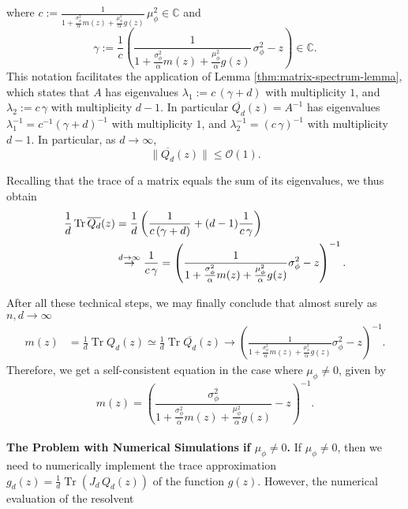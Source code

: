 \documentclass{article}
\begin{document}
where $c:=\frac{1}{1+\frac{\sigma_\phi^2}{\alpha}m(z) + \frac{\mu_\phi^2}{\alpha}g(z)}\,\mu_\phi^2\in\mathbb{C}$ and
\begin{equation}
\gamma:=\frac{1}{c}\left(\frac{1}{1+\frac{\sigma_\phi^2}{\alpha}m(z) + \frac{\mu_\phi^2}{\alpha}g(z)}\,\sigma_\phi^2-z\right)\in\mathbb{C}.
\end{equation}
This notation facilitates the application of Lemma \ref{thm:matrix-spectrum-lemma}, which states that $A$ has eigenvalues $\lambda_1:=c\,(\gamma+d)$ with multiplicity $1$, and $\lambda_2:=c\,\gamma$ with multiplicity $d-1$. In particular $\overline{Q_{d}}(z)=A^{-1}$ has eigenvalues $\lambda_1^{-1}=c^{-1}(\gamma+d)^{-1}$ with multiplicity $1$, and $\lambda_2^{-1}=(c\,\gamma)^{-1}$ with multiplicity $d-1$. In particular, as $d\to\infty$,
\begin{equation}
\|\overline{Q_d}(z)\|\leq\mathcal{O}(1).\label{eq:justification-mu=0}
\end{equation}
\smallskip
\par
Recalling that the trace of a matrix equals the sum of its eigenvalues, we thus obtain
\begin{align}
\frac{1}{d}\operatorname{Tr}\overline{Q_{d}}(z) &= \frac{1}{d}\left(\frac{1}{c\,(\gamma+d)}+(d-1)\frac{1}{c\,\gamma}\right) \notag
\\ &\stackrel{d\to\infty}{\to}\frac{1}{c\,\gamma}=\left(\frac{1}{1+\frac{\sigma_\phi^2}{\alpha}m(z) + \frac{\mu_\phi^2}{\alpha}g(z)}\sigma_\phi^2-z\right)^{-1}.
\end{align}
\bigskip
\par
After all these technical steps, we may finally conclude that almost surely as $n,d\to\infty$
\begin{align}
m(z) &=\frac{1}{d}\operatorname{Tr}Q_{d}(z) \simeq\frac{1}{d}\operatorname{Tr}\overline{Q_{d}}(z) \to \left(\frac{1}{1+\frac{\sigma_\phi^2}{\alpha}m(z) + \frac{\mu_\phi^2}{\alpha}g(z)}\sigma_\phi^2-z\right)^{-1}.
\end{align}
Therefore, we get a self-consistent equation in the case where $\mu_\phi\neq0$, given by
\begin{equation}
m(z)=\left(\frac{\sigma_\phi^2}{1+\frac{\sigma_\phi^2}{\alpha}m(z) + \frac{\mu_\phi^2}{\alpha}g(z)}-z\right)^{-1}.\label{eq:fix-point-2}
\end{equation}
\bigskip
\bigskip
\\
\textbf{The Problem with Numerical Simulations if $\mu_\phi\neq0$.} If $\mu_\phi\neq0$, then we need to numerically implement the trace approximation $g_d(z)=\frac{1}{d}\operatorname{Tr}(J_d\,Q_d(z))$ of the function $g(z)$. However, the numerical evaluation of the resolvent
\end{document}
